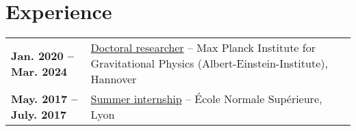 {%
\section*{Experience}
\begin{tabularx}{\textwidth}{lX}
\textbf{Jan. 2020 -- Mar. 2024} & \underline{Doctoral researcher} -- Max Planck Institute for Gravitational Physics (Albert-Einstein-Institute), Hannover\\
\textbf{May. 2017 -- July. 2017} & \underline{Summer internship} -- \'Ecole Normale Sup\'erieure, Lyon\\
\end{tabularx}
}